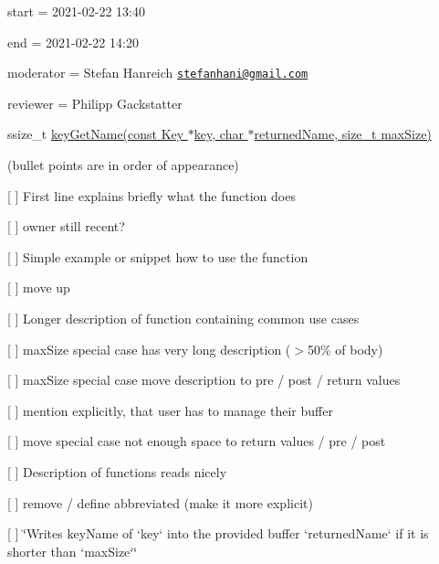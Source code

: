 
\begin{DoxyItemize}
\item start = 2021-\/02-\/22 13\+:40
\item end = 2021-\/02-\/22 14\+:20
\item moderator = Stefan Hanreich \href{mailto:stefanhani@gmail.com}{\tt stefanhani@gmail.\+com}
\item reviewer = Philipp Gackstatter
\end{DoxyItemize}

{\ttfamily ssize\+\_\+t \hyperlink{group__keyname_gab29a850168d9b31c9529e90cf9ab68be}{key\+Get\+Name(const Key $\ast$key, char $\ast$returned\+Name, size\+\_\+t max\+Size)}}

(bullet points are in order of appearance)


\begin{DoxyItemize}
\item \mbox{[} \mbox{]} First line explains briefly what the function does
\begin{DoxyItemize}
\item \mbox{[} \mbox{]} owner still recent?
\end{DoxyItemize}
\item \mbox{[} \mbox{]} Simple example or snippet how to use the function
\begin{DoxyItemize}
\item \mbox{[} \mbox{]} move up
\end{DoxyItemize}
\item \mbox{[} \mbox{]} Longer description of function containing common use cases
\begin{DoxyItemize}
\item \mbox{[} \mbox{]} max\+Size special case has very long description ($>$50\% of body)
\item \mbox{[} \mbox{]} max\+Size special case move description to pre / post / return values
\item \mbox{[} \mbox{]} mention explicitly, that user has to manage their buffer
\item \mbox{[} \mbox{]} move special case \textquotesingle{}not enough space\textquotesingle{} to return values / pre / post
\end{DoxyItemize}
\item \mbox{[} \mbox{]} Description of functions reads nicely
\begin{DoxyItemize}
\item \mbox{[} \mbox{]} remove / define abbreviated (make it more explicit)
\item \mbox{[} \mbox{]} \char`\"{}\+Writes key\+Name of `key` into the provided buffer `returned\+Name` if it is shorter than `max\+Size`\char`\"{}

\end{DoxyItemize}
\end{DoxyItemize}
